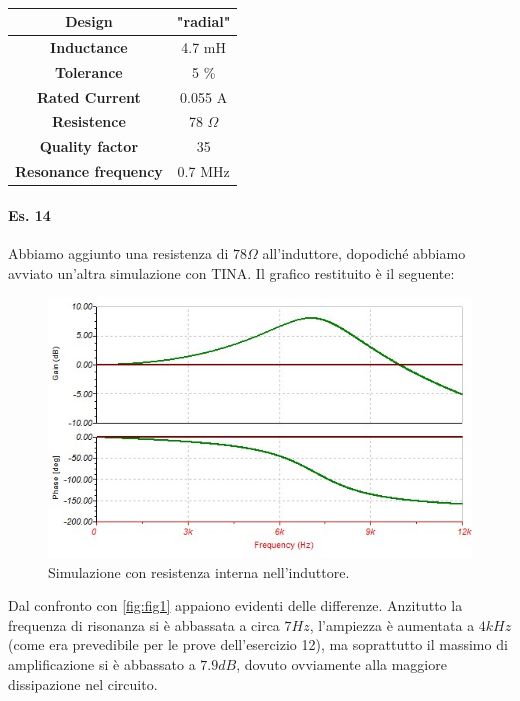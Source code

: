 \documentclass[journal, a4paper]{IEEEtran}
\begin{document}
\begin{table}[htp]
\caption{}
\label{tab:tab2}
\centering
\begin{tabular}{c|c}
\hline
\textbf{Design} & "radial"\\
\hline
\textbf{Inductance} & 4.7 mH\\
\hline
\textbf{Tolerance} & 5 \% \\
\hline
\textbf{Rated Current} & 0.055 A\\
\hline
\textbf{Resistence} & 78 $\Omega$\\
\hline
\textbf{Quality factor} & 35\\
\hline
\textbf{Resonance frequency} & 0.7 MHz\\
\hline
\end{tabular}
\end{table}

\paragraph{Es. 14}

Abbiamo aggiunto una resistenza di $78 \Omega$ all'induttore, dopodiché abbiamo avviato un'altra simulazione con \textsc{TINA}. Il grafico restituito è il seguente:
\begin{figure}[htbp]
\centering
\includegraphics[scale=.4]{tinadiagresint}
\caption{Simulazione con resistenza interna nell'induttore.}
\end{figure}

Dal confronto con \ref{fig:fig1} appaiono evidenti delle differenze. Anzitutto la frequenza di risonanza si è abbassata a circa $7 Hz$, l'ampiezza è aumentata a $4 \si{kHz}$ (come era prevedibile per le prove dell'esercizio 12), ma soprattutto il massimo di amplificazione si è abbassato a $7.9 \si{dB}$, dovuto ovviamente alla maggiore dissipazione nel circuito.
\end{document}
